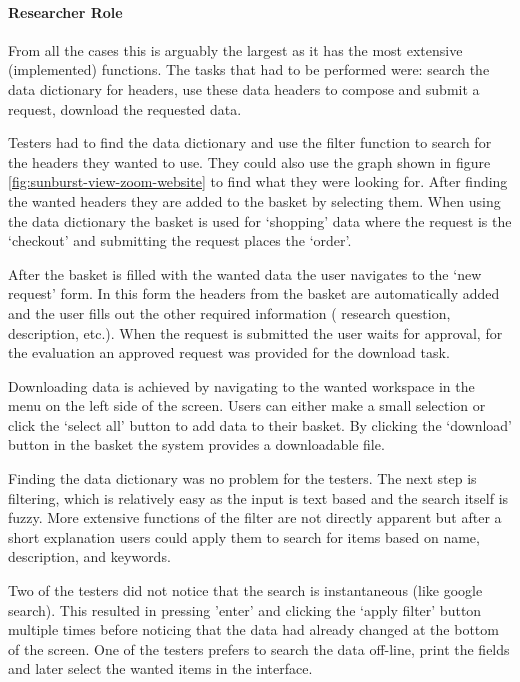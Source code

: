\paragraph{Researcher Role}
From all the cases this is arguably the largest as it has the most extensive (implemented) functions.
The tasks that had to be performed were: search the data dictionary for headers, use these data headers to compose and submit a request, download the requested data.

Testers had to find the data dictionary and use the filter function to search for the headers they wanted to use.
They could also use the graph shown in figure \ref{fig:sunburst-view-zoom-website} to find what they were looking for.
After finding the wanted headers they are added to the basket by selecting them.
When using the data dictionary the basket is used for `shopping' data where the request is the `checkout' and submitting the request places the `order'.

After the basket is filled with the wanted data the user navigates to the `new request' form.
In this form the headers from the basket are automatically added and the user fills out the other required information (\eg{} research question, description, etc.).
When the request is submitted the user waits for approval, for the evaluation an approved request was provided for the download task.

Downloading data is achieved by navigating to the wanted workspace in the menu on the left side of the screen.
Users can either make a small selection or click the `select all' button to add data to their basket.
By clicking the `download' button in the basket the system provides a downloadable file.

Finding the data dictionary was no problem for the testers.
The next step is filtering, which is relatively easy as the input is text based and the search itself is fuzzy.
More extensive functions of the filter are not directly apparent but after a short explanation users could apply them to search for items based on name, description, and keywords.

Two of the testers did not notice that the search is instantaneous (like google search).
This resulted in pressing 'enter' and clicking the `apply filter' button multiple times before noticing that the data had already changed at the bottom of the screen.
One of the testers prefers to search the data off-line, \ie{} print the fields and later select the wanted items in the interface.

